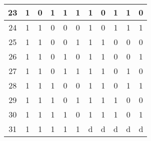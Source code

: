 \documentclass{article}
\begin{document}
\begin{center}
\begin{tabular}{|c|ccccc|ccccc|}
    23 & 1 & 0 & 1 & 1 & 1 & 1 & 0 & 1 & 1 & 0 \\ \hline
    24 & 1 & 1 & 0 & 0 & 0 & 1 & 0 & 1 & 1 & 1 \\ \hline
    25 & 1 & 1 & 0 & 0 & 1 & 1 & 1 & 0 & 0 & 0 \\ \hline
    26 & 1 & 1 & 0 & 1 & 0 & 1 & 1 & 0 & 0 & 1 \\ \hline
    27 & 1 & 1 & 0 & 1 & 1 & 1 & 1 & 0 & 1 & 0 \\ \hline
    28 & 1 & 1 & 1 & 0 & 0 & 1 & 1 & 0 & 1 & 1 \\ \hline
    29 & 1 & 1 & 1 & 0 & 1 & 1 & 1 & 1 & 0 & 0 \\ \hline
    30 & 1 & 1 & 1 & 1 & 0 & 1 & 1 & 1 & 0 & 1 \\ \hline
    31 & 1 & 1 & 1 & 1 & 1 & d & d & d & d & d \\ \hline
\end{tabular}\end{center}
\end{document}

